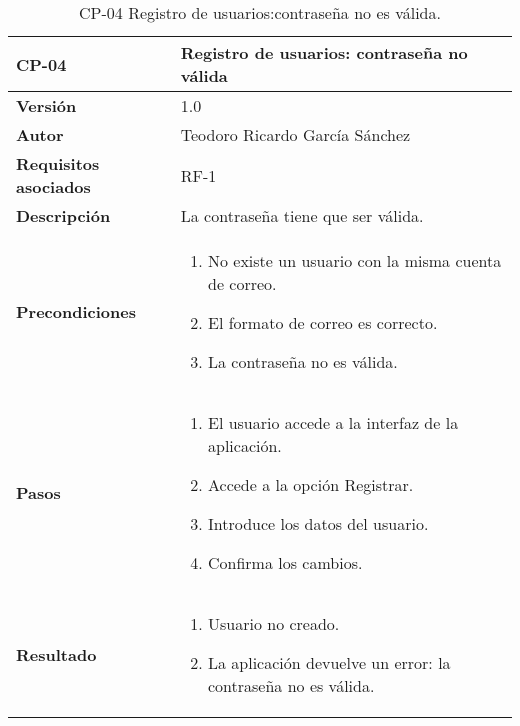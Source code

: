 \begin{table}[p]
	\centering
	\begin{tabularx}{\linewidth}{ p{} p{} }
		\toprule
		\textbf{CP-04}    & \textbf{Registro de usuarios: contraseña no válida}\\
		\toprule
		\textbf{Versión}              & 1.0    \\
		\textbf{Autor}                & Teodoro Ricardo García Sánchez \\
		\textbf{Requisitos asociados} & RF-1 \\
		\textbf{Descripción}          & La contraseña tiene que ser válida.\\
		\textbf{Precondiciones}       &  
		\begin{enumerate}
			\def\labelenumi{\arabic{enumi}.}
			\tightlist
			\item No existe un usuario con la misma cuenta de correo.
			\item El formato de correo es correcto.
			\item La contraseña no es válida.
		\end{enumerate}\\
		\textbf{Pasos}             &
		\begin{enumerate}
			\def\labelenumi{\arabic{enumi}.}
			\tightlist
			\item El usuario accede a la interfaz de la aplicación.
			\item Accede a la opción Registrar.
			\item Introduce los datos del usuario.
			\item Confirma los cambios.
		\end{enumerate}\\
		\textbf{Resultado}          & 
		\begin{enumerate}
			\item Usuario no creado.
			\item La aplicación devuelve un error: la contraseña no es válida.
		\end{enumerate}\\
		\bottomrule
	\end{tabularx}
	\caption{CP-04 Registro de usuarios:contraseña no es válida.}
\end{table}

